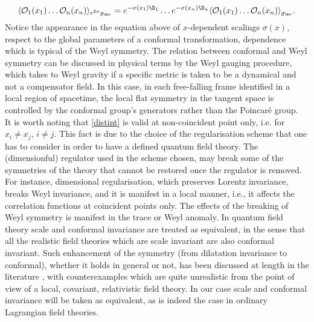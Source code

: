 \documentclass[a4paper,11pt,openright,twoside]{book}
\let\n=\nu      \let\x=\xi     \let\p=\pi      \let\r=\rho
\let\s=\sigma  \let\t=\tau     \let\u=\upsilon \let\f=\phi
\numberwithin{equation}{section}
\begin{document}
\begin{equation}
	\label{distint}
	\langle\mathcal{O}_1(x_1)\dots \mathcal{O}_n(x_n)\rangle_{e^{2\s}g_{\m\n}}=e^{-\s(x_1)\D_1}\dots e^{-\s(x_n)\D_n}\langle\mathcal{O}_1(x_1)\dots \mathcal{O}_n(x_n)\rangle_{g_{\m\n}}.
\end{equation}
Notice the appearance in the equation above of $x$-dependent scalings $\sigma(x)$, respect to the global parameters of a conformal transformation, dependence which is typical of the Weyl symmetry. 
The relation between conformal and Weyl symmetry can be discussed in physical terms by the Weyl gauging procedure, which takes to Weyl gravity if a specific metric is taken to be a dynamical and not a compensator field. In this case, in each free-falling frame identified in a local region of spacetime, the local flat symmetry in the tangent space is controlled by the conformal group's generators rather than the Poincar\'e group.\\
It is worth noting that \eqref{distint} is valid at non-coincident point only, i.e. for $x_i\ne x_j$, $i\ne j$. This fact is due to the choice of the regularisation scheme that one has to consider in order to have a defined quantum field theory. The (dimensionful) regulator used in the scheme chosen, may break some of the symmetries of the theory that cannot be restored once the regulator is removed. For instance,  dimensional regularisation, which preserves Lorentz invariance, breaks Weyl invariance, and it is manifest in a local manner, i.e., it affects the correlation functions at coincident points only. The effects of the breaking of Weyl symmetry is manifest in the {trace} or {Weyl anomaly}.
In quantum field theory scale and conformal invariance are treated as equivalent, in the sense that all the realistic field theories which are scale invariant are also conformal invariant. Such enhancement of the symmetry (from dilatation invariance to conformal), whether it holds in general or not, has been discussed at length in the literature \cite{Nakayama:2013is}, with counterexamples which are quite unrealistic from the point of view of a local, covariant, relativistic field theory. In our case scale and conformal invariance will be taken as equivalent, as is indeed the case in ordinary Lagrangian field theories.  
\end{document}
